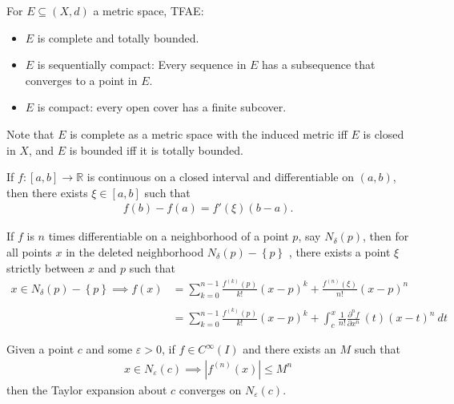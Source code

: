 \begin{theorem}[Folland 0.25]

For \(E \subseteq (X, d)\) a metric space, TFAE:

\begin{itemize}
\tightlist
\item
  \(E\) is complete and totally bounded.
\item
  \(E\) is sequentially compact: Every sequence in \(E\) has a
  subsequence that converges to a point in \(E\).
\item
  \(E\) is compact: every open cover has a finite subcover.
\end{itemize}

Note that \(E\) is complete as a metric space with the induced metric
iff \(E\) is closed in \(X\), and \(E\) is bounded iff it is totally
bounded.

\end{theorem}

\begin{theorem}

If \(f: [a, b] \to {\mathbb{R}}\) is continuous on a closed interval and
differentiable on \((a, b)\), then there exists \(\xi \in [a, b]\) such
that
\begin{align*}
f(b) - f(a) = f'(\xi)(b-a)
.\end{align*}

\end{theorem}

\begin{theorem}

If \(f\) is \(n\) times differentiable on a neighborhood of a point
\(p\), say \(N_\delta(p)\), then for all points \(x\) in the deleted
neighborhood \(N_\delta(p) - \left\{{p}\right\}\) , there exists a point
\(\xi\) strictly between \(x\) and \(p\) such that
\begin{align*}
x \in N_\delta(p)-\left\{{p}\right\} \implies f(x) 
&= \sum_{k=0}^{n-1} \frac{f^{(k)}(p)}{k!}(x-p)^k + \frac{f^{(n)}(\xi)}{n!}(x-p)^n \\ \\
&= \sum_{k=0}^{n-1} \frac{f^{(k)}(p)}{k!}(x-p)^k + \int_c^x \frac{1}{n!} {\frac{\partial ^n f}{\partial x^n}\,}(t) (x-t)^n ~dt
\end{align*}

\end{theorem}

\begin{proposition}

Given a point \(c\) and some \(\varepsilon>0\), if \(f \in C^\infty(I)\)
and there exists an \(M\) such that
\begin{align*}
x \in N_\varepsilon(c) \implies {\left\lvert {f^{(n)}(x)} \right\rvert} \leq M^n
\end{align*}
then the Taylor expansion about \(c\) converges on \(N_\varepsilon(c)\).

\end{proposition}

